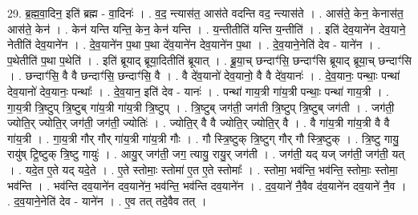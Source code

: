\documentclass[17pt]{extarticle}
\begin{document}
29. ब्र॒ह्म॒वा॒दिन॒ इति॑ ब्रह्म - वा॒दिनः॑ । . व॒द॒ न्त्यास॑त॒ आस॑ते वदन्ति वद॒ न्त्यास॑ते । . आस॑ते॒ केन॒ केनास॑त॒ आस॑ते॒ केन॑ । . केन॑ यन्ति यन्ति॒ केन॒ केन॑ यन्ति । . य॒न्तीतीति॑ यन्ति य॒न्तीति॑ । . इति॑ देव॒याने॑न देव॒याने॒ नेतीति॑ देव॒याने॑न । . दे॒व॒याने॑न प॒था प॒था दे॑व॒याने॑न देव॒याने॑न प॒था । . दे॒व॒याने॒नेति॑ देव - याने॑न । . प॒थेतीति॑ प॒था प॒थेति॑ । . इति॑ ब्रूयाद् ब्रूया॒दितीति॑ ब्रूयात् । . ब्रू॒या॒च् छन्दाꣳ॑सि॒ छन्दाꣳ॑सि ब्रूयाद् ब्रूया॒च् छन्दाꣳ॑सि । . छन्दाꣳ॑सि॒ वै वै छन्दाꣳ॑सि॒ छन्दाꣳ॑सि॒ वै । . वै दे॑व॒यानो॑ देव॒यानो॒ वै वै दे॑व॒यानः॑ । . दे॒व॒यानः॒ पन्थाः॒ पन्था॑ देव॒यानो॑ देव॒यानः॒ पन्थाः᳚ । . दे॒व॒यान॒ इति॑ देव - यानः॑ । . पन्था॑ गाय॒त्री गा॑य॒त्री पन्थाः॒ पन्था॑ गाय॒त्री । . गा॒य॒त्री त्रि॒ष्टुप् त्रि॒ष्टुब् गा॑य॒त्री गा॑य॒त्री त्रि॒ष्टुप् । . त्रि॒ष्टुब् जग॑ती॒ जग॑ती त्रि॒ष्टुप् त्रि॒ष्टुब् जग॑ती । . जग॑ती॒ ज्योति॒र् ज्योति॒र् जग॑ती॒ जग॑ती॒ ज्योतिः॑ । . ज्योति॒र् वै वै ज्योति॒र् ज्योति॒र् वै । . वै गा॑य॒त्री गा॑य॒त्री वै वै गा॑य॒त्री । . गा॒य॒त्री गौर् गौर् गा॑य॒त्री गा॑य॒त्री गौः । . गौ स्त्रि॒ष्टुक् त्रि॒ष्टुग् गौर् गौ स्त्रि॒ष्टुक् । . त्रि॒ष्टु गायु॒ रायु॑ष् ट्रि॒ष्टुक् त्रि॒ष्टु गायुः॑ । . आयु॒र् जग॑ती॒ जग॒ त्यायु॒ रायु॒र् जग॑ती । . जग॑ती॒ यद् यज् जग॑ती॒ जग॑ती॒ यत् । . यदे॒त ए॒ते यद् यदे॒ते । . ए॒ते स्तोमाः॒ स्तोमा॑ ए॒त ए॒ते स्तोमाः᳚ । . स्तोमा॒ भव॑न्ति॒ भव॑न्ति॒ स्तोमाः॒ स्तोमा॒ भव॑न्ति । . भव॑न्ति दव॒याने॑न दव॒याने॑न॒ भव॑न्ति॒ भव॑न्ति दव॒याने॑न । . द॒व॒याने॑ नै॒वैव द॑व॒याने॑न दव॒याने॑ नै॒व । . द॒व॒याने॒नेति॑ देव - याने॑न । . ए॒व तत् तदे॒वैव तत् । \newline
\end{document}
